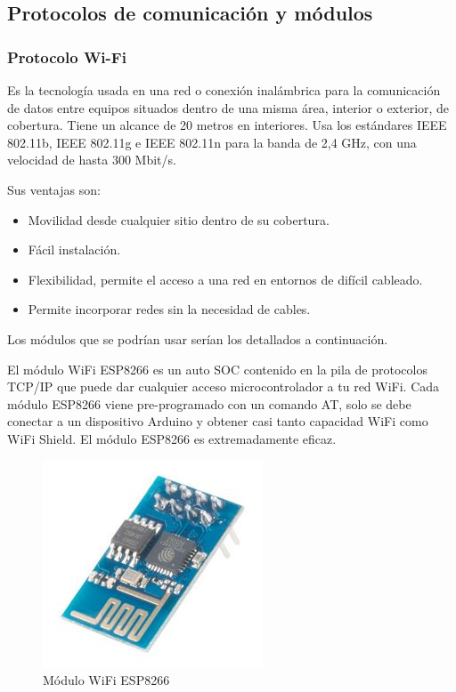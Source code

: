 		
		\subsection{Protocolos de comunicación y módulos}
		
		
			\subsubsection{Protocolo Wi-Fi}
				
				Es la tecnología usada en una red o conexión inalámbrica para la comunicación de datos entre equipos situados dentro de una misma área, interior o exterior, de cobertura. Tiene un alcance de 20 metros en interiores. Usa los estándares IEEE 802.11b, IEEE 802.11g e IEEE 802.11n para la banda de 2,4 GHz, con una velocidad de hasta 300 Mbit/s.
				
				Sus ventajas son:
				
				\begin{itemize}	
					\item Movilidad desde cualquier sitio dentro de su cobertura.
					\item Fácil instalación.
					\item Flexibilidad, permite el acceso a una red en entornos de difícil cableado.
					\item Permite incorporar redes sin la necesidad de cables.
				\end{itemize}
				
				Los módulos que se podrían usar serían los detallados a continuación.
				
				El módulo WiFi ESP8266 \cite{ESP8266} es un auto SOC contenido en la pila de protocolos TCP/IP que puede dar cualquier acceso microcontrolador a tu red WiFi. Cada módulo ESP8266 viene pre-programado con un comando AT, solo se debe conectar a un dispositivo Arduino y obtener casi tanto capacidad WiFi como WiFi Shield. El módulo ESP8266 es extremadamente eficaz.
				
				\begin{figure}[h]
					\centering
					\includegraphics{imagenes/ESP8266.JPG}
					\caption{Módulo WiFi ESP8266}
					\label{contexto:figura}
				\end{figure}
		
